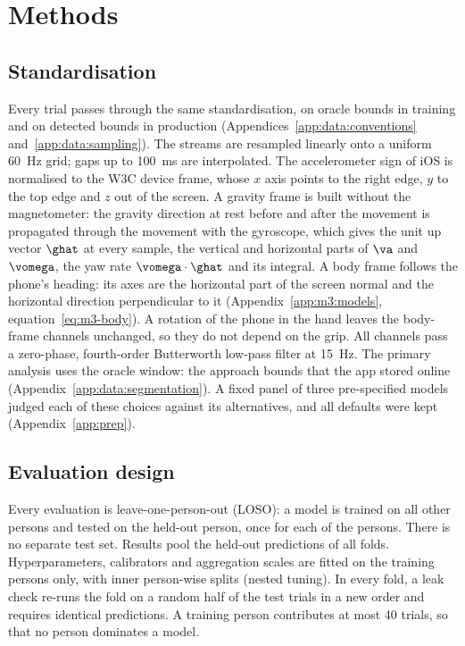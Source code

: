 \section{Methods}\label{sec:methods}

\subsection{Standardisation}\label{sec:methods:standardisation}
Every trial passes through the same standardisation, on oracle bounds in training and on detected bounds in
production (Appendices~\ref{app:data:conventions} and~\ref{app:data:sampling}). The streams are resampled linearly
onto a uniform 60~Hz grid; gaps up to 100~ms are interpolated. The accelerometer sign of iOS is normalised to the
W3C device frame, whose $x$ axis points to the right edge, $y$ to the top edge and $z$ out of the screen. A gravity
frame is built without the magnetometer: the gravity direction at rest before and after the movement is propagated
through the movement with the gyroscope, which gives the unit up vector $\ghat$ at every sample, the vertical and
horizontal parts of $\va$ and $\vomega$, the yaw rate $\vomega\cdot\ghat$ and its integral. A body frame follows the
phone's heading: its axes are the horizontal part of the screen normal and the horizontal direction perpendicular
to it (Appendix~\ref{app:m3:models}, equation~\eqref{eq:m3-body}). A rotation of the phone in the hand leaves the
body-frame channels unchanged, so they do not depend on the grip. All channels pass a zero-phase, fourth-order
Butterworth low-pass filter at 15~Hz. The primary analysis uses the oracle window: the approach bounds that the app
stored online (Appendix~\ref{app:data:segmentation}). A fixed panel of three pre-specified models judged each of
these choices against its alternatives, and all  defaults were kept (Appendix~\ref{app:prep}).

\subsection{Evaluation design}\label{sec:methods:evaluation}
Every evaluation is leave-one-person-out (LOSO): a model is trained on all other persons and tested on the
held-out person, once for each of the  persons. There is no separate test set. Results pool the
held-out predictions of all folds. Hyperparameters, calibrators and aggregation scales are fitted on the training
persons only, with inner person-wise splits (nested tuning). In every fold, a leak check re-runs the fold on a
random half of the test trials in a new order and requires identical predictions. A training person contributes at
most 40 trials, so that no person dominates a model.

